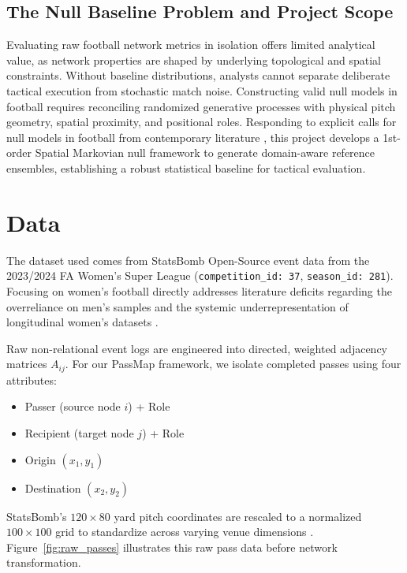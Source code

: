 \documentclass[12pt, a4paper]{article}
\begin{document}
\subsection{The Null Baseline Problem and Project Scope}
\label{subsec:null_problem_scope}
Evaluating raw football network metrics in isolation offers limited analytical value, as network properties are shaped by underlying topological and spatial constraints. Without baseline distributions, analysts cannot separate deliberate tactical execution from stochastic match noise. Constructing valid null models in football requires reconciling randomized generative processes with physical pitch geometry, spatial proximity, and positional roles. Responding to explicit calls for null models in football from contemporary literature \cite{gama2026stoch}, this project develops a 1st-order Spatial Markovian null framework to generate domain-aware reference ensembles, establishing a robust statistical baseline for tactical evaluation.

\newpage
\section{Data}
\label{sec:data}

The dataset used comes from StatsBomb Open-Source event data from the 2023/2024 FA Women's Super League (\texttt{competition\_id: 37}, \texttt{season\_id: 281}). Focusing on women's football directly addresses literature deficits regarding the overreliance on men's samples and the systemic underrepresentation of longitudinal women's datasets \cite{alves2025review, gama2026stoch}.

Raw non-relational event logs are engineered into directed, weighted adjacency matrices $A_{ij}$. For our PassMap framework, we isolate completed passes using four attributes:
\begin{itemize}[leftmargin=*, itemsep=3pt, parsep=0pt]
    \item Passer (source node $i$) + Role
    \item Recipient (target node $j$) + Role
    \item Origin $(x_1, y_1)$
    \item Destination $(x_2, y_2)$
\end{itemize}

StatsBomb's $120 \times 80$ yard pitch coordinates are rescaled to a normalized $100 \times 100$ grid to standardize across varying venue dimensions \cite{buldu2019}. Figure~\ref{fig:raw_passes} illustrates this raw pass data before network transformation.
\end{document}
